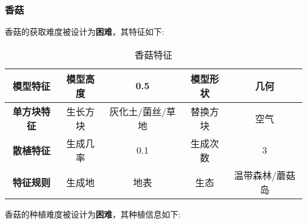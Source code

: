 \subsubsection{香菇}

香菇的获取难度被设计为\textbf{困难}，其特征如下:
\begin{table}[H]
    \centering
    \caption{香菇特征}
    \label{table:香菇特征}
    \setlength{\tabcolsep}{4mm}
    \begin{tabular}{c|cc|cc}
        \toprule
        \textbf{模型特征}   & 模型高度 & 0.5      & 模型形状 & 几何     \\
        \midrule
        \textbf{单方块特征} & 生长方块 & 灰化土/菌丝/草地 & 替换方块 & 空气     \\
        \midrule
        \textbf{散植特征}   & 生成几率 & 0.1   & 生成次数 & 3        \\
        \midrule
        \textbf{特征规则}   & 生成地   & 地表   & 生态     & 温带森林/蘑菇岛 \\
        \bottomrule
    \end{tabular}
\end{table}


香菇的种植难度被设计为\textbf{困难}，其种植信息如下:

